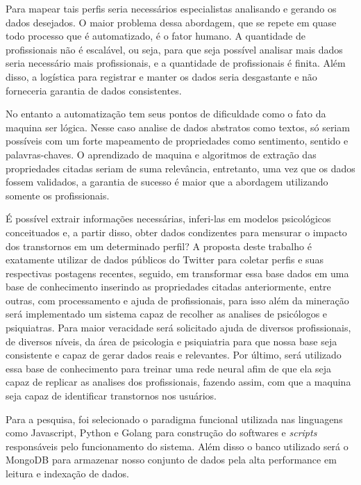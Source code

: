 Para mapear tais perfis seria necessários especialistas analisando e gerando os dados desejados. O maior problema dessa abordagem, que se repete em quase todo processo que é automatizado, é o fator humano. A quantidade de profissionais não é escalável, ou seja, para que seja possível analisar mais dados seria necessário mais profissionais, e a quantidade de profissionais é finita. Além disso, a logística para registrar e manter os dados seria desgastante e não forneceria garantia de dados consistentes.

No entanto a automatização tem seus pontos de dificuldade como o fato da maquina ser lógica. Nesse caso analise de dados abstratos como textos, só seriam possíveis com um forte mapeamento de propriedades como sentimento, sentido e palavras-chaves. O aprendizado de maquina e algoritmos de extração das propriedades citadas seriam de suma relevância, entretanto, uma vez que os dados fossem validados, a garantia de sucesso é maior que a abordagem utilizando somente os profissionais.

É possível extrair informações necessárias, inferi-las em modelos psicológicos conceituados e, a partir disso, obter dados condizentes para mensurar o impacto dos transtornos em um determinado perfil? A proposta deste trabalho é exatamente utilizar de dados públicos do Twitter para coletar perfis e suas respectivas postagens recentes, seguido, em transformar essa base dados em uma base de conhecimento inserindo as propriedades citadas anteriormente, entre outras, com processamento e ajuda de profissionais, para isso além da mineração será implementado um sistema capaz de recolher as analises de psicólogos e psiquiatras. Para maior veracidade será solicitado ajuda de diversos profissionais, de diversos níveis, da área de psicologia e psiquiatria para que nossa base seja consistente e capaz de gerar dados reais e relevantes. Por último, será utilizado essa base de conhecimento para treinar uma rede neural afim de que ela seja capaz de replicar as analises dos profissionais, fazendo assim, com que a maquina seja capaz de identificar transtornos nos usuários.

Para a pesquisa, foi selecionado o paradigma funcional utilizada nas linguagens como Javascript, Python e Golang para construção do softwares e \textit{scripts} responsáveis pelo funcionamento do sistema. Além disso o banco utilizado será o MongoDB para armazenar nosso conjunto de dados pela alta performance em leitura e indexação de dados.
